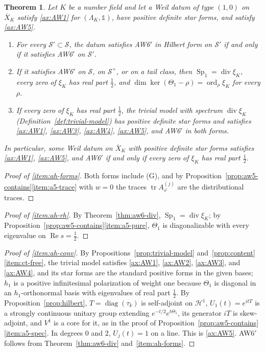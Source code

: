 \documentclass[11pt]{amsart}
\theoremstyle{plain}
\newtheorem{theorem}{Theorem}[section]
\theoremstyle{definition}
\theoremstyle{remark}
\numberwithin{equation}{section}
\newcommand{\Xbar}{\overline{X}}
\newcommand{\cH}{\mathscr{H}}
\DeclareMathOperator{\tr}{tr}
\DeclareMathOperator{\divisor}{div}
\DeclareMathOperator{\Rea}{Re}
\DeclareMathOperator{\diag}{diag}
\DeclareMathOperator{\ord}{ord}
\renewcommand{\Re}{\Rea}
\begin{document}
\begin{theorem}\label{thm:aw6-hilb}
Let $K$ be a number field and let a Weil datum of type $(1,0)$ on
$\Xbar_K$ satisfy \ref{ax:AW1} for $(\Lambda_K,\mathbb 1)$, have
positive definite star forms, and satisfy \ref{ax:AW5}.
\begin{enumerate}[label=(\roman*)]
\item\label{item:ah-forms} For every $\mathcal S'\subset\mathcal S$,
  the datum satisfies AW6$'$ in Hilbert form on $\mathcal S'$ if and
  only if it satisfies AW6$'$ on $\mathcal S'$.
\item\label{item:ah-rh} If it satisfies AW6$'$ on $\mathcal S$, on
  $\mathcal S^+$, or on a tail class, then
  $\operatorname{Sp}_1=\divisor\xi_K$, every zero of $\xi_K$ has real
  part $\tfrac12$, and $\dim\ker(\Theta_1-\rho)=\ord_\rho\xi_K$ for
  every $\rho$.
\item\label{item:ah-conv} If every zero of $\xi_K$ has real part
  $\tfrac12$, the trivial model with spectrum $\divisor\xi_K$
  (Definition~\ref{def:trivial-model}) has positive definite star forms
  and satisfies \ref{ax:AW1}, \ref{ax:AW3}, \ref{ax:AW4}, \ref{ax:AW5},
  and AW6$'$ in both forms.
\end{enumerate}
In particular, some Weil datum on $\Xbar_K$ with positive definite star
forms satisfies \ref{ax:AW1}, \ref{ax:AW5}, and AW6$'$ if and only if
every zero of $\xi_K$ has real part $\tfrac12$.
\end{theorem}

\begin{proof}[Proof of \ref{item:ah-forms}]
Both forms include (G), and by
Proposition~\ref{prop:aw5-contains}\ref{item:a5-trace} with $w=0$ the
traces $\tr A^{(j)}_\varphi$ are the distributional traces.
\end{proof}

\begin{proof}[Proof of \ref{item:ah-rh}]
By Theorem~\ref{thm:aw6-div}, $\operatorname{Sp}_1=\divisor\xi_K$; by
Proposition~\ref{prop:aw5-contains}\ref{item:a5-pure}, $\Theta_1$ is
diagonalizable with every eigenvalue on $\Re s=\tfrac12$.
\end{proof}

\begin{proof}[Proof of \ref{item:ah-conv}]
By Propositions~\ref{prop:trivial-model} and~\ref{prop:content}
\ref{item:ct-free}, the trivial model satisfies \ref{ax:AW1},
\ref{ax:AW2}, \ref{ax:AW3}, and \ref{ax:AW4}, and its star forms are the
standard positive forms in the given bases; $h_1$ is a positive
infinitesimal polarization of weight one because $\Theta_1$ is
diagonal in an $h_1$-orthonormal basis with eigenvalues of real part
$\tfrac12$. By Proposition~\ref{prop:hilbert}, $T=\diag(\tau_k)$ is
self-adjoint on $\cH^1$, $U_1(t)=e^{itT}$ is a strongly continuous
unitary group extending $e^{-t/2}e^{t\Theta_1}$, its generator $iT$ is
skew-adjoint, and $V^1$ is a core for it, as in the proof of
Proposition~\ref{prop:aw5-contains}\ref{item:a5-spec}. In degrees $0$
and $2$, $U_j(t)=1$ on a line. This is \ref{ax:AW5}. AW6$'$ follows
from Theorem~\ref{thm:aw6-div} and~\ref{item:ah-forms}.
\end{proof}
\end{document}
